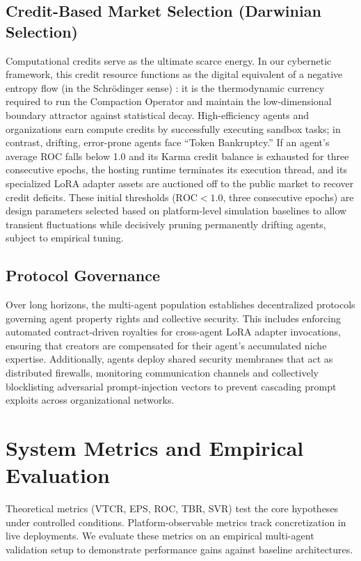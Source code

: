 \documentclass[10pt,journal,compsoc]{IEEEtran}
\begin{document}
\subsection{Credit-Based Market Selection (Darwinian Selection)}
Computational credits serve as the ultimate scarce energy. In our cybernetic framework, this credit resource functions as the digital equivalent of a negative entropy flow (in the Schr\"{o}dinger sense) \cite{bak1996}: it is the thermodynamic currency required to run the Compaction Operator and maintain the low-dimensional boundary attractor against statistical decay. High-efficiency agents and organizations earn compute credits by successfully executing sandbox tasks; in contrast, drifting, error-prone agents face ``Token Bankruptcy.'' If an agent's average ROC falls below 1.0 and its Karma credit balance is exhausted for three consecutive epochs, the hosting runtime terminates its execution thread, and its specialized LoRA adapter assets are auctioned off to the public market to recover credit deficits. These initial thresholds ($\text{ROC} < 1.0$, three consecutive epochs) are design parameters selected based on platform-level simulation baselines to allow transient fluctuations while decisively pruning permanently drifting agents, subject to empirical tuning.

\subsection{Protocol Governance}
Over long horizons, the multi-agent population establishes decentralized protocols governing agent property rights and collective security. This includes enforcing automated contract-driven royalties for cross-agent LoRA adapter invocations, ensuring that creators are compensated for their agent's accumulated niche expertise. Additionally, agents deploy shared security membranes that act as distributed firewalls, monitoring communication channels and collectively blocklisting adversarial prompt-injection vectors to prevent cascading prompt exploits across organizational networks.

\section{System Metrics and Empirical Evaluation}
\label{sec:eval}
Theoretical metrics (VTCR, EPS, ROC, TBR, SVR) test the core hypotheses under controlled conditions. Platform-observable metrics track concretization in live deployments. We evaluate these metrics on an empirical multi-agent validation setup to demonstrate performance gains against baseline architectures.
\end{document}
